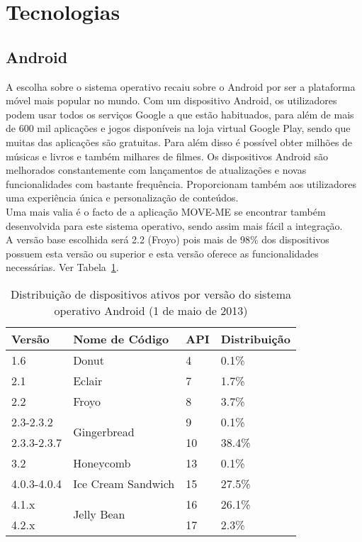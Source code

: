 \section{Tecnologias}

\subsection{Android}

A escolha sobre o sistema operativo recaiu sobre o Android por ser a plataforma móvel mais popular no mundo. Com um dispositivo Android, os utilizadores podem usar todos os serviços Google a que estão habituados, para além de mais de 600 mil aplicações e jogos disponíveis na loja virtual Google Play, sendo que muitas das aplicações são gratuitas. Para além disso é possível obter milhões de músicas e livros e também milhares de filmes. Os dispositivos Android são melhorados constantemente com lançamentos de atualizações e novas funcionalidades com bastante frequência. Proporcionam também aos utilizadores uma experiência única e personalização de conteúdos.
\\Uma mais valia é o facto de a aplicação MOVE-ME se encontrar também desenvolvida para este sistema operativo, sendo assim mais fácil a integração.
\\A versão base escolhida será 2.2 (Froyo) pois mais de 98\% dos dispositivos possuem esta versão ou superior e esta versão oferece as funcionalidades necessárias. Ver Tabela~\ref{tab:android}.

\begin{table}[t]
  \centering
  \caption{Distribuição de dispositivos ativos por versão do sistema operativo Android (1 de maio de 2013)\cite{dashboards}}
\begin{tabular}{p{20mm} p{45mm} p{10mm} p{20mm} }
	\hline
\textbf{Versão} & \textbf{Nome de Código} & \textbf{API} & \textbf{Distribuição}\\
	\hline
	\hline
	1.6 & Donut & 4 & 0.1\%\\\hline
	2.1 & Eclair & 7 & 1.7\%\\\hline
	2.2 & Froyo & 8 & 3.7\%\\\hline
	2.3-2.3.2 & \multirow{2}{*}{Gingerbread} & 9 & 0.1\%\\
	2.3.3-2.3.7 & & 10 & 38.4\%\\\hline
	3.2 & Honeycomb & 13 & 0.1\%\\\hline
	4.0.3-4.0.4 & Ice Cream Sandwich & 15 & 27.5\%\\\hline
	4.1.x & \multirow{2}{*}{Jelly Bean} & 16 & 26.1\%\\
	4.2.x & & 17 & 2.3\%\\\hline
\end{tabular}
  \label{tab:android}
\end{table}

